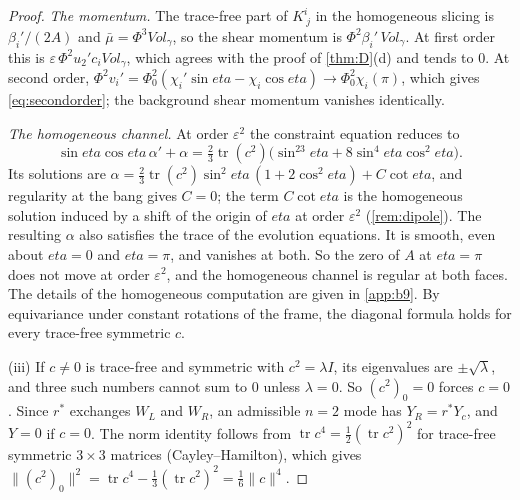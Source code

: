 \documentclass[11pt]{article}
\theoremstyle{canonmath}
\theoremstyle{canonpostulate}
\theoremstyle{canonproposition}
\theoremstyle{canonmath}
\theoremstyle{canonproposition}
\def\mathrm#1{#1}%
\def\eta{eta}%
\begin{document}
\begin{proof}
\emph{The momentum.} The trace-free part of $K^i_{\ j}$ in the homogeneous slicing is $\beta_i'/(2A)$ and $\bar\mu = \Phi^3\mathrm{Vol}_\gamma$, so the shear momentum is $\Phi^2\beta_i'\,\mathrm{Vol}_\gamma$. At first order this is $\varepsilon\,\Phi^2u_2'c_i\mathrm{Vol}_\gamma$, which agrees with the proof of \cref{thm:D}(d) and tends to $0$. At second order, $\Phi^2v_i' = \Phi_0^2(\chi_i'\sin\eta - \chi_i\cos\eta)\to\Phi_0^2\chi_i(\pi)$, which gives \eqref{eq:secondorder}; the background shear momentum vanishes identically.

\emph{The homogeneous channel.} At order $\varepsilon^2$ the constraint equation reduces to
\[
\sin\eta\cos\eta\,\alpha' + \alpha = \tfrac23\operatorname{tr}(c^2)\bigl(\sin^23\eta + 8\sin^4\eta\cos^2\eta\bigr).
\]
Its solutions are $\alpha = \tfrac23\operatorname{tr}(c^2)\sin^2\eta\,(1+2\cos^2\eta) + C\cot\eta$, and regularity at the bang gives $C = 0$; the term $C\cot\eta$ is the homogeneous solution induced by a shift of the origin of $\eta$ at order $\varepsilon^2$ (\cref{rem:dipole}). The resulting $\alpha$ also satisfies the trace of the evolution equations. It is smooth, even about $\eta = 0$ and $\eta = \pi$, and vanishes at both. So the zero of $A$ at $\eta = \pi$ does not move at order $\varepsilon^2$, and the homogeneous channel is regular at both faces. The details of the homogeneous computation are given in \cref{app:b9}. By equivariance under constant rotations of the frame, the diagonal formula holds for every trace-free symmetric $c$.

(iii) If $c\neq0$ is trace-free and symmetric with $c^2 = \lambda I$, its eigenvalues are $\pm\sqrt\lambda$, and three such numbers cannot sum to $0$ unless $\lambda = 0$. So $(c^2)_0 = 0$ forces $c = 0$. Since $r^*$ exchanges $W_L$ and $W_R$, an admissible $n=2$ mode has $Y_R = r^*Y_c$, and $Y = 0$ if $c = 0$. The norm identity follows from $\operatorname{tr}c^4 = \tfrac12(\operatorname{tr}c^2)^2$ for trace-free symmetric $3\times3$ matrices (Cayley--Hamilton), which gives $\|(c^2)_0\|^2 = \operatorname{tr}c^4 - \tfrac13(\operatorname{tr}c^2)^2 = \tfrac16\|c\|^4$.


\end{proof}
\end{document}
